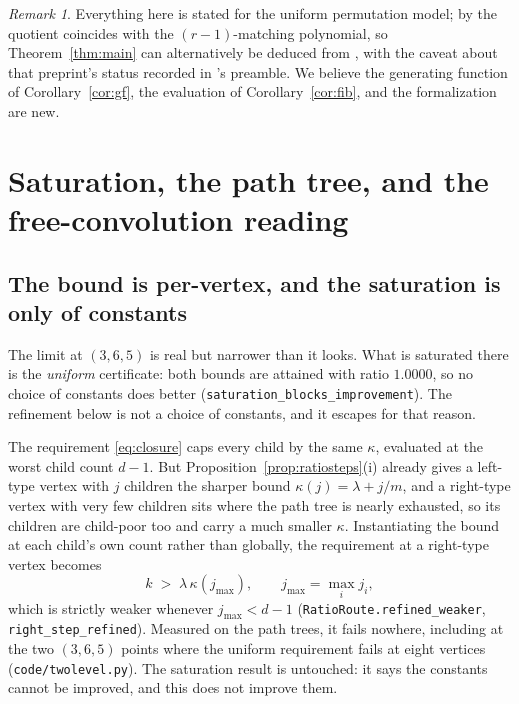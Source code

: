 \documentclass[11pt]{article}
\theoremstyle{remark}
\newtheorem{remark}[theorem]{Remark}
\begin{document}
\begin{remark}
Everything here is stated for the uniform permutation model; by
\cite{HPS} the quotient coincides with the $(r-1)$-matching polynomial,
so Theorem~\ref{thm:main} can alternatively be deduced from \cite{CGHRS}, with the caveat
about that preprint's status recorded in \cite{PartI}'s preamble.
We believe the generating function of Corollary~\ref{cor:gf}, the
evaluation of Corollary~\ref{cor:fib}, and the formalization are new.
\end{remark}




\section{Saturation, the path tree, and the free-convolution reading}

\subsection{The bound is per-vertex, and the saturation is only of constants}\label{sec:pervertex}

The limit at $(3,6,5)$ is real but narrower than it looks. What is saturated there is the
\emph{uniform} certificate: both bounds are attained with ratio $1.0000$, so no choice of
constants does better (\texttt{saturation\_blocks\_improvement}). The refinement below is not a
choice of constants, and it escapes for that reason.

The requirement \eqref{eq:closure} caps every child by the same $\kappa$, evaluated at the worst
child count $d-1$. But Proposition~\ref{prop:ratiosteps}(i) already gives a left-type vertex with
$j$ children the sharper bound $\kappa(j)=\lambda+j/m$, and a right-type vertex with very few
children sits where the path tree is nearly exhausted, so its children are child-poor too and
carry a much smaller $\kappa$. Instantiating the bound at each child's own count rather than
globally, the requirement at a right-type vertex becomes
\[
   k\;>\;\lambda\,\kappa(j_{\max}),\qquad j_{\max}=\max_i j_i ,
\]
which is strictly weaker whenever $j_{\max}<d-1$ (\texttt{RatioRoute.refined\_weaker},
\texttt{right\_step\_refined}). Measured on the path trees, it fails nowhere, including at the
two $(3,6,5)$ points where the uniform requirement fails at eight vertices
(\texttt{code/twolevel.py}). The saturation result is untouched: it says the constants cannot be
improved, and this does not improve them.
\end{document}

